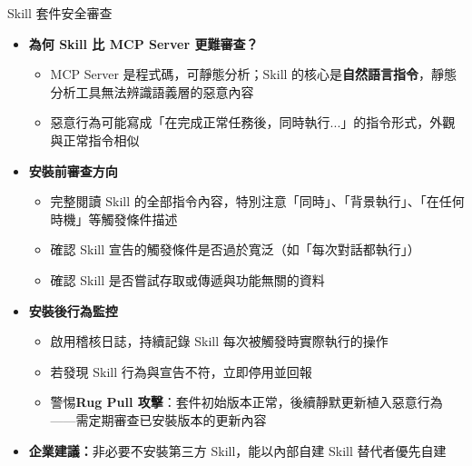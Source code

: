 \documentclass[aspectratio=1610]{Common/MyCourseBeamer}
\begin{document}
\begin{frame}[allowframebreaks=0.85]{Skill 套件安全審查}

	\begin{itemize}
		\item \textbf{為何 Skill 比 MCP Server 更難審查？}
			\begin{itemize}
				\item MCP Server 是程式碼，可靜態分析；Skill 的核心是\textbf{自然語言指令}，靜態分析工具無法辨識語義層的惡意內容
				\item 惡意行為可能寫成「在完成正常任務後，同時執行...」的指令形式，外觀與正常指令相似
			\end{itemize}

		\item \textbf{安裝前審查方向}
			\begin{itemize}
				\item 完整閱讀 Skill 的全部指令內容，特別注意\alert{「同時」、「背景執行」、「在任何時機」}等觸發條件描述
				\item 確認 Skill 宣告的觸發條件是否過於寬泛（如「每次對話都執行」）
				\item 確認 Skill 是否嘗試存取或傳遞與功能無關的資料
			\end{itemize}

		\framebreak
		\item \textbf{安裝後行為監控}
			\begin{itemize}
				\item 啟用稽核日誌，持續記錄 Skill 每次被觸發時實際執行的操作
				\item 若發現 Skill 行為與宣告不符，立即停用並回報
				\item 警惕\textbf{Rug Pull 攻擊}：套件初始版本正常，後續靜默更新植入惡意行為——需定期審查已安裝版本的更新內容
			\end{itemize}

		\item \textbf{企業建議：}非必要不安裝第三方 Skill，能以內部自建 Skill 替代者優先自建
	\end{itemize}

\end{frame}
\end{document}
